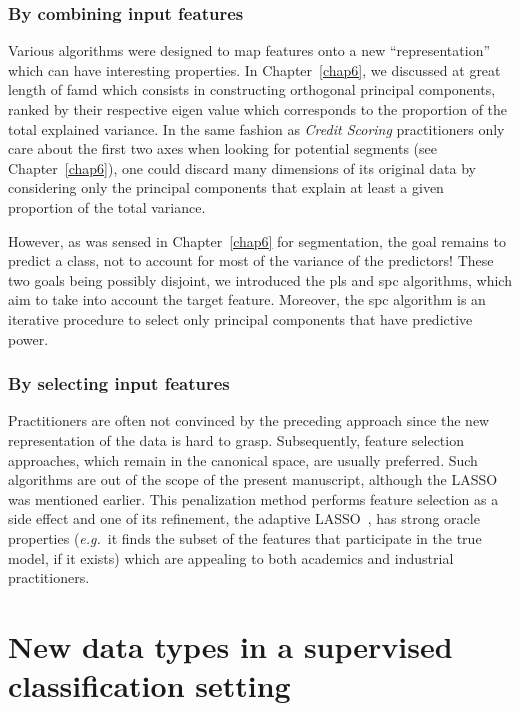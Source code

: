 \subsubsection{By combining input features}

Various algorithms were designed to map features onto a new ``representation'' which can have interesting properties. In Chapter~\ref{chap6}, we discussed at great length of \gls{famd} which consists in constructing orthogonal principal components, ranked by their respective eigen value which corresponds to the proportion of the total explained variance. In the same fashion as \textit{Credit Scoring} practitioners only care about the first two axes when looking for potential segments (see Chapter~\ref{chap6}), one could discard many dimensions of its original data by considering only the principal components that explain at least a given proportion of the total variance.

However, as was sensed in Chapter~\ref{chap6} for segmentation, the goal remains to predict a class, not to account for most of the variance of the predictors! These two goals being possibly disjoint, we introduced the \gls{pls} and \gls{spc} algorithms, which aim to take into account the target feature. Moreover, the \gls{spc} algorithm is an iterative procedure to select only principal components that have predictive power.


\subsubsection{By selecting input features}

Practitioners are often not convinced by the preceding approach since the new representation of the data is hard to grasp. Subsequently, feature selection approaches, which remain in the canonical space, are usually preferred. Such algorithms are out of the scope of the present manuscript, although the LASSO was mentioned earlier. This penalization method performs feature selection as a side effect and one of its refinement, the adaptive LASSO~\cite{zou2006adaptive}, has strong oracle properties (\textit{e.g.}\ it finds the subset of the features that participate in the true model, if it exists) which are appealing to both academics and industrial practitioners.

\section{New data types in a supervised classification setting}

